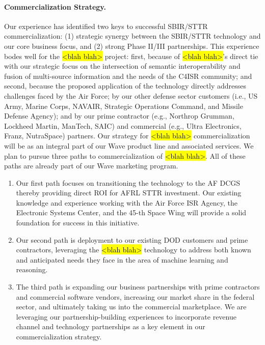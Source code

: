 \documentclass{sbir}
\begin{document}
\paragraph{Commercialization Strategy.} Our experience has identified two keys to successful SBIR/STTR commercialization: (1) strategic synergy between the SBIR/STTR technology and our core business focus, and (2) strong Phase II/III partnerships.
This experience bodes well for the \hl{<blah blah>} project: first, because of \hl{<blah blah>}'s direct tie with our strategic focus on the intersection of semantic interoperability and fusion of multi-source information and the needs of the C4ISR community; and second, because the proposed application of the technology directly addresses challenges faced by the Air Force; by our other defense sector customers (i.e., US Army, Marine Corps, NAVAIR, Strategic Operations Command, and Missile Defense Agency); and by our prime contractor (e.g., Northrop Grumman, Lockheed Martin, ManTech, SAIC) and commercial (e.g., Ultra Electronics, Franz, NutraSpace) partners.
Our strategy for \hl{<blah blah>} commercialization will be as an integral part of our Wave product line and associated services. We plan to pursue three paths to commercialization of \hl{<blah blah>}. All of these paths are already part of our Wave marketing program.
\begin{enumerate}
  \item Our first path focuses on transitioning the technology to the AF DCGS thereby providing direct ROI for AFRL STTR investment. Our existing knowledge and experience working with the Air Force ISR Agency, the Electronic Systems Center, and the 45-th Space Wing will provide a solid foundation for success in this initiative.
  \item Our second path is deployment to our existing DOD customers and prime contractors, leveraging the \hl{<blah blah>} technology to address both known and anticipated needs they face in the area of machine learning and reasoning.
  \item The third path is expanding our business partnerships with prime contractors and commercial software vendors, increasing our market share in the federal sector, and ultimately taking us into the commercial marketplace. We are leveraging our partnership-building experiences to incorporate revenue channel and technology partnerships as a key element in our commercialization strategy.
\end{enumerate}
\end{document}
